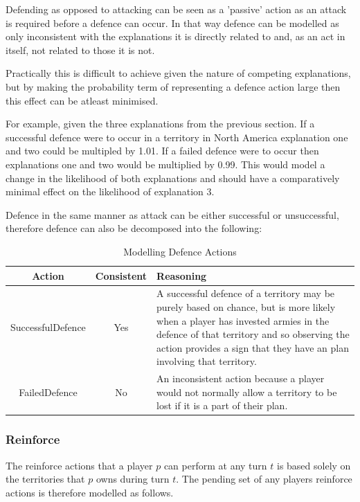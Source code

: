 \documentclass[parskip]{cs4rep}
\begin{document}
Defending as opposed to attacking can be seen as a 'passive' action as an attack is required before a defence can occur. In that way defence can be modelled as only inconsistent with the explanations it is directly related to and, as an act in itself, not related to those it is not. 

Practically this is difficult to achieve given the nature of competing explanations, but by making the probability term of representing a defence action large then this effect can be atleast minimised.

For example, given the three explanations from the previous section. If a successful defence were to occur in a territory in North America explanation one and two could be multipled by 1.01. If a failed defence were to occur then explanations one and two would be multiplied by 0.99. This would model a change in the likelihood of both explanations and should have a comparatively minimal effect on the likelihood of explanation 3. 

Defence in the same manner as attack can be either successful or unsuccessful, therefore defence can also be decomposed into the following: 

\begin{table}[ht]
\centering
\begin{tabular}{|c|c|p{8cm}|}
\hline 
\textbf{Action} & \textbf{Consistent}  & \textbf{Reasoning} \\ 
\hline 
SuccessfulDefence & Yes & A successful defence of a territory may be purely based on chance, but is more likely when a player has invested armies in the defence of that territory and so observing the action provides a sign that they have an plan involving that territory. \\ 
\hline 
FailedDefence & No & An inconsistent action because a player would not normally allow a territory to be lost if it is a part of their plan. \\ 
\hline
\end{tabular}
\caption{Modelling Defence Actions}
\label{table:attack-defend-modelling}
\end{table}

\newpage

\subsubsection{Reinforce}

The reinforce actions that a player $p$ can perform at any turn $t$ is based solely on the territories that $p$ owns during turn $t$. The pending set of any players reinforce actions is therefore modelled as follows. 
\end{document}
